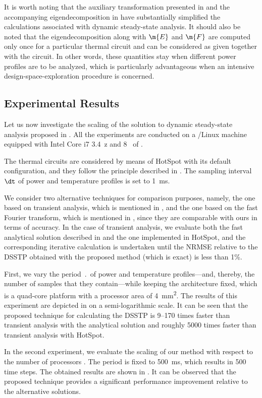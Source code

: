 It is worth noting that the auxiliary transformation presented in
 and the accompanying eigendecomposition in
 have substantially simplified the calculations
associated with dynamic steady-state analysis. It should also be noted that the
eigendecomposition along with $\m{E}$ and $\m{F}$ are computed only once for a
particular thermal  circuit and can be considered as given together with
the circuit. In other words, these quantities stay when different power profiles
are to be analyzed, which is particularly advantageous when an intensive
design-space-exploration procedure is concerned.

\subsection{Experimental Results}

Let us now investigate the scaling of the solution to dynamic steady-state
analysis proposed in . All the experiments
are conducted on a /Linux machine equipped with Intel Core i7
3.4~z and 8~ of .

The thermal  circuits are considered by means of HotSpot
\cite{skadron2003} with its default configuration, and they follow the principle
described in . The sampling interval $\dt$ of power and
temperature profiles is set to 1~ms.

We consider two alternative techniques for comparison purposes, namely, the one
based on transient analysis, which is mentioned in
, and the one based on the fast Fourier
transform, which is mentioned in , since they
are comparable with ours in terms of accuracy. In the case of transient
analysis, we evaluate both the fast analytical solution described in
 and the one implemented in HotSpot, and the
corresponding iterative calculation is undertaken until the \ac{NRMSE} relative
to the \ac{DSSTP} obtained with the proposed method (which is exact) is less
than 1\%.

First, we vary the period $\period$ of power and temperature profiles---and,
thereby, the number of samples \ns that they contain---while keeping the
architecture fixed, which is a quad-core platform with a processor area of
4~mm\textsuperscript{2}. The results of this experiment are depicted in
 on a semi-logarithmic scale. It can be seen that the
proposed technique for calculating the \ac{DSSTP} is 9--170 times faster than
transient analysis with the analytical solution and roughly 5000 times faster
than transient analysis with HotSpot.

In the second experiment, we evaluate the scaling of our method with respect to
the number of processors \np. The period is fixed to 500~ms, which results in
500 time steps. The obtained results are shown in . It
can be observed that the proposed technique provides a significant performance
improvement relative to the alternative solutions.

